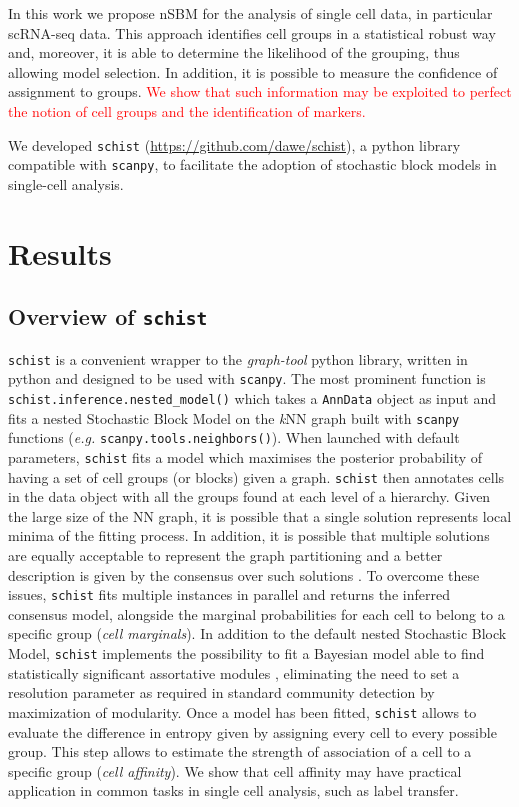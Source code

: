 \documentclass[10pt]{article}
\begin{document}
In this work we propose nSBM for the analysis of single cell data, in particular scRNA-seq data. This approach identifies cell groups in a statistical robust way and, moreover, it is able to determine the likelihood of the grouping, thus allowing model selection. In addition, it is possible to measure the confidence of assignment to groups. \textcolor{red}{We show that such information may be exploited to perfect the notion of cell groups and the identification of markers.}

We developed \texttt{schist} (\href{https://github.com/dawe/schist}{https:/\slash github.com\slash dawe\slash schist}), a python library compatible with \texttt{scanpy}, to facilitate the adoption of stochastic block models in single-cell analysis.

\section*{Results}

\subsection*{Overview of \texttt{schist}}

\texttt{schist} is a convenient wrapper to the \emph{graph-tool} python library, written in python and designed to be used with \texttt{scanpy}. The most prominent function is \texttt{schist.inference.nested\_model()} which takes a \texttt{AnnData} object as input and fits a nested Stochastic Block Model on the \emph{k}NN graph built with \texttt{scanpy} functions (\emph{e.g.} \texttt{scanpy.tools.neighbors()}). When launched with default parameters, \texttt{schist} fits a model which maximises the posterior probability of having a set of cell groups (or blocks) given a graph. \texttt{schist} then annotates cells in the data object with all the groups found at each level of a hierarchy. Given the large size of the NN graph, it is possible that a single solution represents local minima of the fitting process. In addition, it is possible that multiple solutions are equally acceptable to represent the graph partitioning and a better description is given by the consensus over such solutions \cite{Peixoto_2021_consensus}. To overcome these issues, \texttt{schist} fits multiple instances in parallel and returns the inferred consensus model, alongside the marginal probabilities for each cell to belong to a specific group (\emph{cell marginals}). 
In addition to the default nested Stochastic Block Model, \texttt{schist} implements the possibility to fit a Bayesian model able to find statistically significant assortative modules \cite{Zhang_Peixoto_2020}, eliminating the need to set a resolution parameter as required in standard community detection by maximization of modularity.
Once a model has been fitted, \texttt{schist} allows to evaluate the difference in entropy given by assigning every cell to every possible group. This step allows to estimate the strength of association of a cell to a specific group (\emph{cell affinity}). We show that cell affinity may have practical application in common tasks in single cell analysis, such as label transfer.
\end{document}
